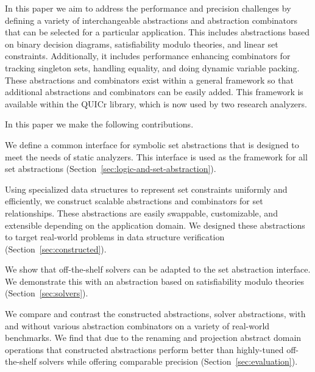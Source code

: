 In this paper we aim to address the performance and precision challenges
by defining a variety of interchangeable abstractions and abstraction
combinators that can be selected for a particular application.
This includes abstractions based on binary decision diagrams,
satisfiability modulo theories, and linear set constraints.
Additionally, it includes performance enhancing combinators for tracking
singleton sets, handling equality, and doing dynamic variable packing.
These abstractions and combinators exist within a general framework so
that additional abstractions and combinators can be easily added.
This framework is available within the QUICr library, which is now
used by two research analyzers.

In this paper we make the following contributions.
\begin{compactitem}
\item We define a common interface for symbolic set abstractions that is designed to meet the needs of static analyzers.
  This interface is used as the framework for all set
  abstractions (Section~\ref{sec:logic-and-set-abstraction}).
\item Using specialized data structures to represent set constraints uniformly and efficiently, we construct scalable abstractions and combinators for set relationships.  These abstractions are easily swappable, customizable, and extensible depending on the application domain.  We designed these abstractions to target real-world problems in data structure verification (Section~\ref{sec:constructed}).
\item We show that off-the-shelf solvers can be adapted to the set abstraction interface.  We demonstrate this with an abstraction based on satisfiability modulo theories (Section~\ref{sec:solvers}).
\item We compare and contrast the constructed abstractions, solver
  abstractions, with and without various abstraction combinators on a
  variety of real-world benchmarks.  We find that due to the renaming and projection abstract domain operations that constructed abstractions perform better than highly-tuned off-the-shelf solvers while offering comparable precision (Section~\ref{sec:evaluation}).
\end{compactitem}